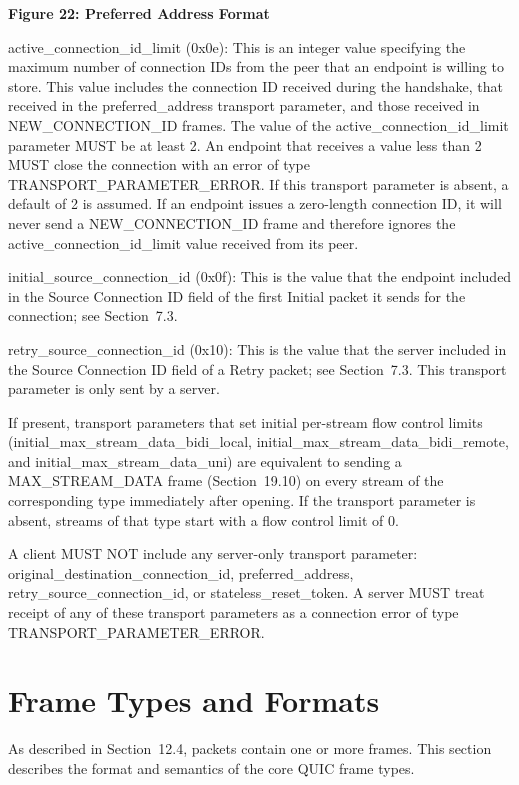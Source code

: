 \documentclass{article}
\begin{document}
\begin{center}
\textbf{Figure 22: Preferred Address Format}
\end{center}

active\_connection\_id\_limit (0x0e):  This is an integer value specifying the maximum number of connection IDs from the peer that an endpoint is willing to store.  This value includes the connection ID received during the handshake, that received in the preferred\_address transport parameter, and those received in NEW\_CONNECTION\_ID frames.  The value of the active\_connection\_id\_limit parameter MUST be at least 2.  An endpoint that receives a value less than 2 MUST close the connection with an error of type TRANSPORT\_PARAMETER\_ERROR.  If this transport parameter is absent, a default of 2 is assumed.  If an endpoint issues a zero-length connection ID, it will never send a NEW\_CONNECTION\_ID frame and therefore ignores the active\_connection\_id\_limit value received from its peer.

initial\_source\_connection\_id (0x0f):  This is the value that the endpoint included in the Source Connection ID field of the first Initial packet it sends for the connection; see Section~7.3.

retry\_source\_connection\_id (0x10):  This is the value that the server included in the Source Connection ID field of a Retry packet; see Section~7.3.  This transport parameter is only sent by a server.

If present, transport parameters that set initial per-stream flow control limits (initial\_max\_stream\_data\_bidi\_local, initial\_max\_stream\_data\_bidi\_remote, and initial\_max\_stream\_data\_uni) are equivalent to sending a MAX\_STREAM\_DATA frame (Section~19.10) on every stream of the corresponding type immediately after opening.  If the transport parameter is absent, streams of that type start with a flow control limit of 0.

A client MUST NOT include any server-only transport parameter: original\_destination\_connection\_id, preferred\_address, retry\_source\_connection\_id, or stateless\_reset\_token.  A server MUST treat receipt of any of these transport parameters as a connection error of type TRANSPORT\_PARAMETER\_ERROR.

\section{Frame Types and Formats}

As described in Section~12.4, packets contain one or more frames. This section describes the format and semantics of the core QUIC frame types.
\end{document}
